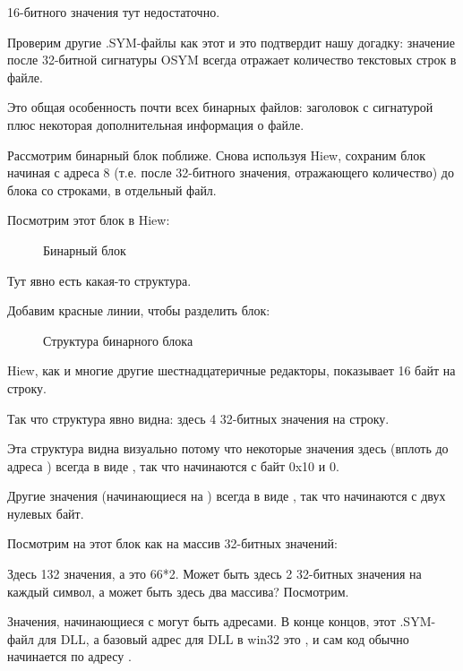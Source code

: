 16-битного значения тут недостаточно.

Проверим другие .SYM-файлы как этот и это подтвердит нашу догадку: значение после 32-битной сигнатуры OSYM
всегда отражает количество текстовых строк в файле.

Это общая особенность почти всех бинарных файлов: заголовок с сигнатурой плюс некоторая дополнительная
информация о файле.

Рассмотрим бинарный блок поближе.
Снова используя Hiew, сохраним блок начиная с адреса 8 (т.е. после 32-битного значения,
отражающего количество) до блока со строками, в отдельный файл.%

\clearpage
Посмотрим этот блок в Hiew:

\begin{figure}[H]
\centering
{}
\caption{Бинарный блок}
\label{fig:oracle_SYM_binary1}
\end{figure}

Тут явно есть какая-то структура. 

\clearpage
Добавим красные линии, чтобы разделить блок: 

\begin{figure}[H]
\centering
{}
\caption{Структура бинарного блока}
\label{fig:oracle_SYM_binary2}
\end{figure}

Hiew, как и многие другие шестнадцатеричные редакторы, показывает 16 байт на строку.

Так что структура явно видна: здесь 4 32-битных значения на строку.

Эта структура видна визуально потому что некоторые значения здесь (вплоть до адреса ) 
всегда в виде , так что начинаются с байт 0x10 и 0.

Другие значения (начинающиеся на ) всегда в виде , так что начинаются с двух
нулевых байт.

Посмотрим на этот блок как на массив 32-битных значений:



Здесь 132 значения, а это 66*2.
Может быть здесь 2 32-битных значения на каждый символ, а может быть здесь два массива? 
Посмотрим.

Значения, начинающиеся с  могут быть адресами.
В конце концов, этот .SYM-файл для DLL, а базовый адрес для DLL в win32 это , и сам код
обычно начинается по адресу .

